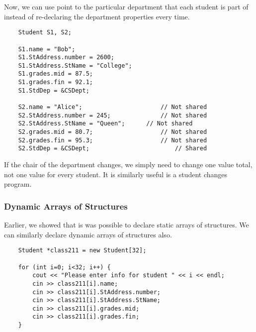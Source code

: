 \documentclass[]{article}
\begin{document}
Now, we can use point to the particular department that each student is part of instead of re-declaring the department properties every time.

\begin{lstlisting}
	Student S1, S2;
	
	S1.name = "Bob";
	S1.StAddress.number = 2600;
	S1.StAddress.StName = "College";
	S1.grades.mid = 87.5;
	S1.grades.fin = 92.1;
	S1.StdDep = &CSDept;
	
	S2.name = "Alice";						// Not shared
	S2.StAddress.number = 245;				// Not shared
	S2.StAddress.StName = "Queen";		// Not shared
	S2.grades.mid = 80.7;					// Not shared
	S2.grades.fin = 95.3;					// Not shared
	S2.StdDep = &CSDept;						// Shared
\end{lstlisting}\bigbreak

If the chair of the department changes, we simply need to change one value total, not one value for every student. It is similarly useful is a student changes program.


\subsubsection{Dynamic Arrays of Structures}
\bigbreak

Earlier, we showed that is was possible to declare static arrays of structures. We can similarly declare dynamic arrays of structures also.

\begin{lstlisting}
	Student *class211 = new Student[32];
	
	for (int i=0; i<32; i++) {
		cout << "Please enter info for student " << i << endl;
		cin >> class211[i].name;
		cin >> class211[i].StAddress.number;
		cin >> class211[i].StAddress.StName;
		cin >> class211[i].grades.mid;
		cin >> class211[i].grades.fin;
	}
\end{lstlisting}\bigbreak
\end{document}
